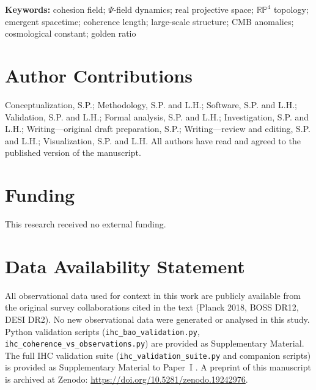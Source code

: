 \documentclass[12pt,a4paper]{article}
\theoremstyle{remark}
\begin{document}
\noindent\textbf{Keywords:}
cohesion field; $\Psi$-field dynamics; real projective space; $\mathbb{RP}^4$
topology; emergent spacetime; coherence length; large-scale structure; CMB
anomalies; cosmological constant; golden ratio


\newcommand{\chapter}[1]{}






\section*{Author Contributions}

Conceptualization, S.P.; Methodology, S.P. and L.H.; Software, S.P. and L.H.;
Validation, S.P. and L.H.; Formal analysis, S.P. and L.H.; Investigation, S.P. and
L.H.; Writing---original draft preparation, S.P.;
Writing---review and editing, S.P. and L.H.; Visualization, S.P. and L.H.
All authors have read and agreed to the published version of the manuscript.

\section*{Funding}

This research received no external funding.

\section*{Data Availability Statement}

All observational data used for context in this work are publicly available
from the original survey collaborations cited in the text (Planck 2018, BOSS
DR12, DESI DR2). No new observational data were generated or analysed in this
study. Python validation scripts (\texttt{ihc\_bao\_validation.py},
\texttt{ihc\_coherence\_vs\_observations.py}) are provided as Supplementary
Material. The full IHC validation suite (\texttt{ihc\_validation\_suite.py}
and companion scripts) is provided as Supplementary Material to Paper~I
\citep{Peacock2026a}. A preprint of this manuscript is archived at
Zenodo: \url{https://doi.org/10.5281/zenodo.19242976}.
\end{document}
